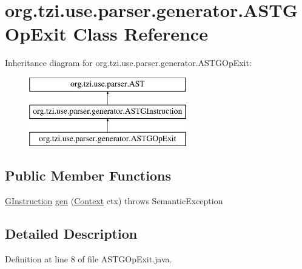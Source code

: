 \hypertarget{classorg_1_1tzi_1_1use_1_1parser_1_1generator_1_1_a_s_t_g_op_exit}{\section{org.\-tzi.\-use.\-parser.\-generator.\-A\-S\-T\-G\-Op\-Exit Class Reference}
\label{classorg_1_1tzi_1_1use_1_1parser_1_1generator_1_1_a_s_t_g_op_exit}
}
Inheritance diagram for org.\-tzi.\-use.\-parser.\-generator.\-A\-S\-T\-G\-Op\-Exit\-:\begin{figure}[H]
\begin{center}
\leavevmode
\includegraphics[height=3.000000cm]{classorg_1_1tzi_1_1use_1_1parser_1_1generator_1_1_a_s_t_g_op_exit}
\end{center}
\end{figure}
\subsection*{Public Member Functions}
\begin{DoxyCompactItemize}
\item 
\hyperlink{interfaceorg_1_1tzi_1_1use_1_1gen_1_1assl_1_1statics_1_1_g_instruction}{G\-Instruction} \hyperlink{classorg_1_1tzi_1_1use_1_1parser_1_1generator_1_1_a_s_t_g_op_exit_ada5f946c5db6db2ec5ea4f90d5c399ac}{gen} (\hyperlink{classorg_1_1tzi_1_1use_1_1parser_1_1_context}{Context} ctx)  throws Semantic\-Exception 
\end{DoxyCompactItemize}


\subsection{Detailed Description}


Definition at line 8 of file A\-S\-T\-G\-Op\-Exit.\-java.



